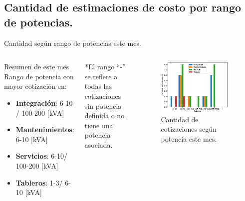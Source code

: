 \documentclass[aspectratio=169,xcolor=dvipsnames]{beamer}
\begin{document}
\subsection{Cantidad de estimaciones de costo por rango de potencias.}
\begin{frame}{Cantidad según rango de potencias este mes.}

\begin{columns}[c]
 \begin{block}{Resumen de este mes}
    Rango de potencia con mayor cotización en:
     \begin{itemize}
         \item \textbf{Integración}: 6-10 / 100-200 [kVA]
         \item \textbf{Mantenimientos}: 6-10 [kVA]
         \item \textbf{Servicios}: 6-10/ 100-200 [kVA]
         \item \textbf{Tableros}: 1-3/ 6-10 [kVA]
     \end{itemize}
\end{block}

\begin{block}{}
    \tiny{*El rango ``-'' se refiere a todas las cotizaciones sin potencia definida o no tiene una potencia asociada.}
\end{block} 

\begin{figure}
     \includegraphics[width=0.9\textwidth]{EPS/potencia_mes.eps}
     \caption{Cantidad de cotizaciones según potencia este mes.}
     \label{figure:potencia_mes}
\end{figure}
\end{columns}
    
\end{frame}
\end{document}
